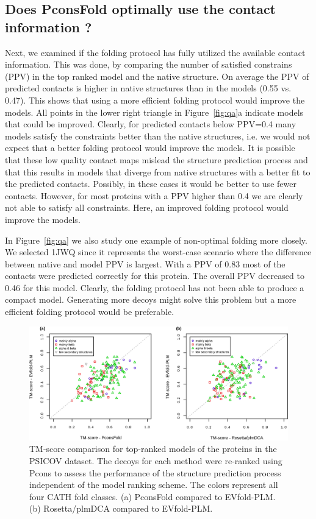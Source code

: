 \documentclass{bioinfo}
\begin{document}
\subsection{Does PconsFold optimally use the contact information ? }

Next, we examined if the folding protocol has fully utilized the
available contact information. This was done, by comparing the number
of satisfied constrains (PPV) in the top ranked model and the native
structure.  On average the PPV of predicted contacts is higher in
native structures than in the models (0.55 vs. 0.47). This shows that
using a more efficient folding protocol would improve the models. All
points in the lower right triangle in Figure~\ref{fig:qa}a indicate
models that could be improved.  Clearly, for predicted contacts below
PPV=0.4 many models satisfy the constraints better than the native
structures, i.e. we would not expect that a better folding protocol
would improve the models.  It is possible that these low quality
contact maps mislead the structure prediction process and that this
results in models that diverge from native structures with a better
fit to the predicted contacts. Possibly, in these cases it would be
better to use fewer contacts. 
However, for most proteins with a PPV higher than 0.4 we are
clearly not able to satisfy all constraints. Here, an improved folding
protocol would improve the models.


In Figure~\ref{fig:qa} we also study one example of non-optimal
folding more closely. We selected 1JWQ since it represents the
worst-case scenario where the difference between native and model PPV
is largest. With a PPV of 0.83 most of the contacts were predicted
correctly for this protein. The overall PPV decreased to 0.46 for this
model. Clearly, the folding protocol has not been able to produce a
compact model. Generating more decoys might solve this problem but a
more efficient folding protocol would be preferable.





\begin{figure}[!tpb]%
\centerline{\includegraphics[scale=0.6]{figures/vs.eps}}
\caption{TM-score comparison for top-ranked models of the proteins in
 the PSICOV dataset. The decoys for each method were re-ranked using
 Pcons to assess the performance of the structure prediction process
 independent of the model ranking scheme. The colors represent all
 four CATH fold classes. (a) PconsFold compared to EVfold-PLM. (b)
 Rosetta/plmDCA compared to EVfold-PLM.}\label{fig:vs}
\end{figure}
\end{document}
